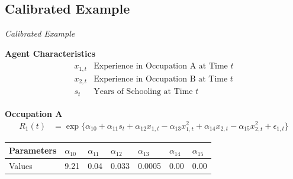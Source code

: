\subsection{Calibrated Example}
\begin{frame}\begin{center}
\LARGE\textit{Calibrated Example}
\end{center}\end{frame}
\begin{frame}
\textbf{Agent Characteristics}\vspace{0.3cm}
\begin{align*}\begin{array}{ll}
x_{1,t} &  \text{Experience in Occupation A at Time $t$}\\
x_{2,t} &  \text{Experience in Occupation B at Time $t$}\\
s_{t}  &  \text{Years of Schooling at Time $t$}
\end{array}\end{align*}
\end{frame}
\begin{frame}\vspace{0.3cm}

\textbf{Occupation A}\vspace{0.3cm}
\begin{align*}
R_1(t) & = \exp\{\alpha_{10} + \alpha_{11}s_t + \alpha_{12}x_{1,t} - \alpha_{13}x_{1,t}^2 + \alpha_{14}x_{2,t} - \alpha_{15}x_{2,t}^2 + \epsilon_{1,t}  \}
\end{align*}\vspace{-1.2cm}

\begin{center}
\begin{tabular}{L{1.8cm} C{1cm} C{1cm} C{1cm} C{1.2cm} C{1cm} C{1cm}}\toprule
Parameters  &  $\alpha_{10}$ &  $\alpha_{11}$ &  $\alpha_{12}$ &  $\alpha_{13}$ &  $\alpha_{14}$ &  $\alpha_{15}$ \\\midrule
    Values  &  9.21 & 0.04 &  0.033 &  0.0005  &  0.00 &  0.00\\\bottomrule
\end{tabular}
\end{center}


\end{frame}
